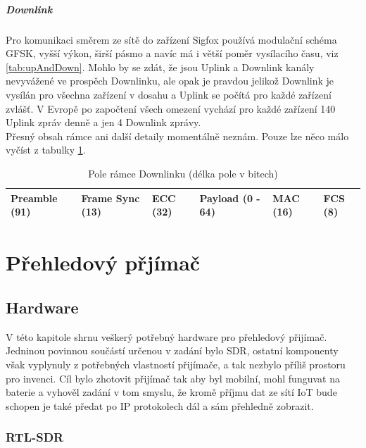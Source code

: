 \documentclass{ctuthesis}
\begin{document}
\subsubsection{Downlink}
Pro komunikaci směrem ze sítě do zařízení Sigfox používá modulační schéma GFSK, vyšší výkon, širší pásmo a navíc má i větší poměr vysílacího času, viz \ref{tab:upAndDown}. Mohlo by se zdát, že jsou Uplink a Downlink kanály nevyvážené ve prospěch Downlinku, ale opak je pravdou jelikož Downlink je vysílán pro všechna zařízení v dosahu a Uplink se počítá pro každé zařízení zvlášť. V Evropě po započtení všech omezení vychází pro každé zařízení 140 Uplink zpráv denně a jen 4 Downlink zprávy.\\
Přesný obsah rámce ani další detaily momentálně neznám. Pouze lze něco málo vyčíst z tabulky \ref{tab:downlinkFrame}.
\begin{table}[]
\begin{tabular}{@{}|l|l|l|l|l|l|@{}}
\toprule
Preamble (91) & Frame Sync (13) & ECC (32) & Payload (0 - 64) & MAC (16) & FCS (8) \\ \bottomrule
\end{tabular}
\caption{Pole rámce Downlinku (délka pole v bitech)}
\label{tab:downlinkFrame}
\end{table}

\part{Přehledový přjímač}
\chapter{Hardware}
V této kapitole shrnu veškerý potřebný hardware pro přehledový přijímač. Jedninou povinnou součástí určenou v zadání bylo SDR, ostatní komponenty však vyplynuly z potřebných vlastností přijímače, a tak nezbylo příliš prostoru pro invenci. Cíl bylo zhotovit přijímač tak aby byl mobilní, mohl funguvat na baterie a vyhověl zadání v tom smyslu, že kromě příjmu dat ze sítí IoT bude schopen je také předat po IP protokolech dál a sám přehledně zobrazit.
\section{RTL-SDR}
\end{document}
